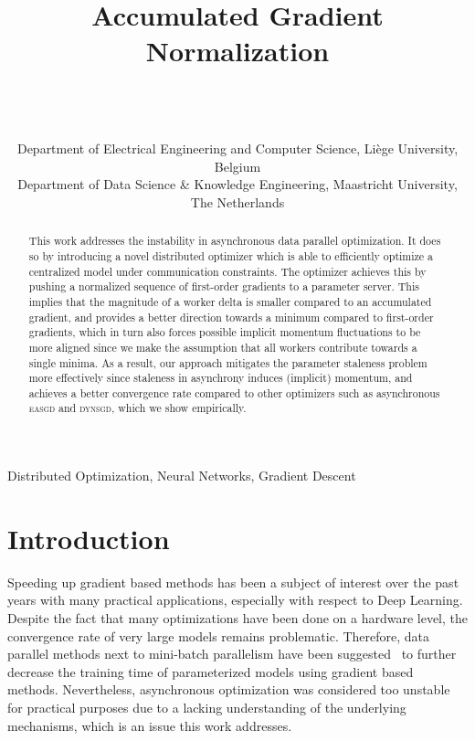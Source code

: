 \documentclass[wcp]{jmlr}
\title[Accumulated Gradient Normalization]{Accumulated Gradient Normalization}
\author{\Name{Joeri R. Hermans}\Email{joeri.hermans@doct.ulg.ac.be}\\
  \Name{Gerasimos Spanakis} \Email{jerry.spanakis@maastrichtuniversity.nl}\\
  \Name{Rico M\"ockel} \Email{rico.mockel@maastrichtuniversity.nl}\\
  \addr Department of Electrical Engineering and Computer Science, Li\`ege University, Belgium\\
  \addr Department of Data Science \& Knowledge Engineering, Maastricht University, The Netherlands
}
\begin{document}
\maketitle

\begin{abstract}
This work addresses the instability in asynchronous data parallel optimization. It does so by introducing a novel distributed optimizer which is able to efficiently optimize a centralized model under communication constraints. The optimizer achieves this by pushing a normalized sequence of first-order gradients to a parameter server. This implies that the magnitude of a worker delta is smaller compared to an accumulated gradient, and provides a better direction towards a minimum compared to first-order gradients, which in turn also forces possible implicit momentum fluctuations to be more aligned since we make the assumption that all workers contribute towards a single minima. As a result, our approach mitigates the parameter staleness problem more effectively since staleness in asynchrony induces (implicit) momentum, and achieves a better convergence rate compared to other optimizers such as asynchronous \textsc{easgd} and \textsc{dynsgd}, which we show empirically.
\end{abstract}
\begin{keywords}
Distributed Optimization, Neural Networks, Gradient Descent
\end{keywords}

\section{Introduction}
\label{sec:introduction}

Speeding up gradient based methods has been a subject of interest over the past years with many practical applications, especially with respect to Deep Learning. Despite the fact that many optimizations have been done on a hardware level, the convergence rate of very large models remains problematic. Therefore, data parallel methods next to mini-batch parallelism have been suggested~\cite{dean2012large, ho2013more, hadjis2016omnivore, recht2011hogwild, louppe2010zealous, jiang2017heterogeneity, zhang2015deep} to further decrease the training time of parameterized models using gradient based methods. Nevertheless, asynchronous optimization was considered too unstable for practical purposes due to a lacking understanding of the underlying mechanisms, which is an issue this work addresses.\\
\end{document}
